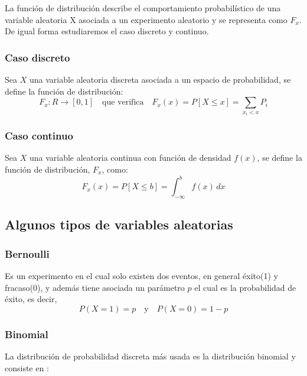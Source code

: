 \documentclass[
  12pt,
]{krantz}
\theoremstyle{definition}
\theoremstyle{definition}
\theoremstyle{definition}
\theoremstyle{remark}
\begin{document}
La función de distribución describe el comportamiento probabilístico de una variable aleatoria X asociada a un experimento aleatorio y se representa como \(F_x\). De igual forma estudiaremos el caso discreto y continuo.

\hypertarget{caso-discreto}{%
\subsubsection{Caso discreto}\label{caso-discreto}}

Sea \(X\) una variable aleatoria discreta asociada a un espacio de probabilidad, se define la función de distribución: \[F_x:R\rightarrow [0,1] \quad \textrm{que verifica} \quad F_x(x)=P[X\leq x]=\sum_{x_i<x} P_i\]

\hypertarget{caso-continuo}{%
\subsubsection{Caso continuo}\label{caso-continuo}}

Sea \(X\) una variable aleatoria continua con función de densidad \(f(x)\), se define la función de distribución, \(F_x\), como:\[F_x(x)=P[X \leq b ] = \int_{-\infty}^{b}  \! f(x) \, dx\]

\hypertarget{algunos-tipos-de-variables-aleatorias}{%
\subsection{Algunos tipos de variables aleatorias}\label{algunos-tipos-de-variables-aleatorias}}

\hypertarget{bernoulli}{%
\subsubsection{Bernoulli}\label{bernoulli}}

Es un experimento en el cual solo existen dos eventos, en general éxito(1) y fracaso(0), y además tiene asociada un parámetro \(p\) el cual es la probabilidad de éxito, es decir, \[P(X=1)=p \quad \textrm{y} \quad P(X=0)=1-p\]

\hypertarget{binomial}{%
\subsubsection{Binomial}\label{binomial}}

La distribución de probabilidad discreta más usada es la distribución binomial y consiste en :
\end{document}
